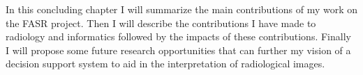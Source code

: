 In this concluding chapter I will summarize the main contributions of my work on the FASR project. Then I will describe the contributions I have made to radiology and informatics followed by the impacts of these contributions. Finally I will propose some future research opportunities that can further my vision of a decision support system to aid in the interpretation of radiological images.